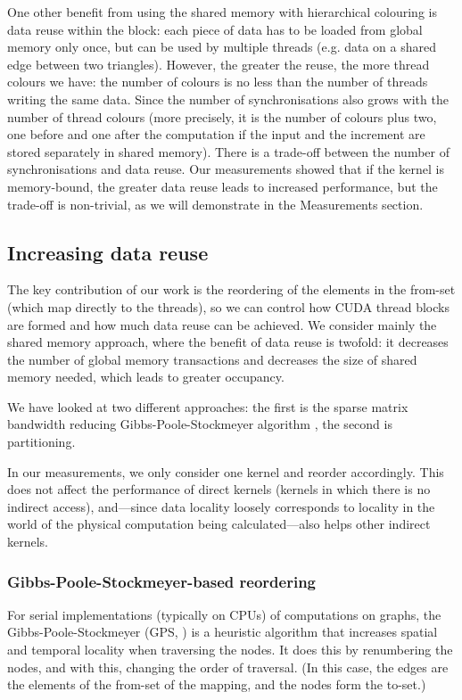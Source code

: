 One other benefit from using the shared memory with hierarchical colouring is
data reuse within the block: each piece of data has to be loaded from global
memory only once, but can be used by multiple threads (e.g. data on a shared
edge between two triangles). However, the greater the reuse, the more thread
colours we have: the number of colours is no less than the number of threads
writing the same data. Since the number of synchronisations also grows with the
number of thread colours (more precisely, it is the number of colours plus two,
one before and one after the computation if the input and the increment are
stored separately in shared memory). There is a trade-off between the number of
synchronisations and data reuse. Our measurements showed that if the kernel is
memory-bound, the greater data reuse leads to increased performance, but the
trade-off is non-trivial, as we will demonstrate in the Measurements section.

\subsection{Increasing data reuse}\label{increasing-data-reuse}
The key contribution of our work is the reordering of the elements in the
from-set (which map directly to the threads), so we can control how CUDA thread blocks
are formed and how much data reuse can be achieved. We consider mainly the
shared memory approach, where the benefit of data reuse is twofold: it decreases
the number of global memory transactions and decreases the size of shared memory
needed, which leads to greater occupancy.

We have looked at two different approaches: the first is the sparse matrix
bandwidth reducing Gibbs-Poole-Stockmeyer algorithm \cite{gps}, the second is partitioning.

In our measurements, we only consider one kernel and reorder accordingly. This
does not affect the performance of direct kernels (kernels in which there is no
indirect access), and---since data locality loosely corresponds to locality in
the world of the physical computation being calculated---also helps other
indirect kernels.

\subsubsection{Gibbs-Poole-Stockmeyer-based reordering}

For serial implementations (typically on CPUs) of computations on graphs, the
Gibbs-Poole-Stockmeyer (GPS, \cite{gps}) is a heuristic algorithm that increases
spatial and temporal locality when traversing the nodes. It does this by
renumbering the nodes, and with this, changing the order of traversal. (In this
case, the edges are the elements of the from-set of the mapping, and the nodes
form the to-set.)

